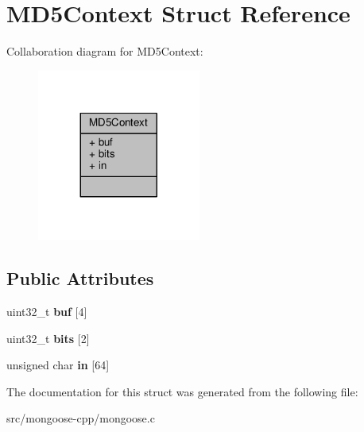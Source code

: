 \hypertarget{structMD5Context}{}\section{M\+D5\+Context Struct Reference}
\label{structMD5Context}


Collaboration diagram for M\+D5\+Context\+:
\nopagebreak
\begin{figure}[H]
\begin{center}
\leavevmode
\includegraphics[width=152pt]{d9/d12/structMD5Context__coll__graph}
\end{center}
\end{figure}
\subsection*{Public Attributes}
\begin{DoxyCompactItemize}
\item 
uint32\+\_\+t {\bfseries buf} \mbox{[}4\mbox{]}\hypertarget{structMD5Context_a6129b10b90387e1cb1d4cd92e4605c33}{}\label{structMD5Context_a6129b10b90387e1cb1d4cd92e4605c33}

\item 
uint32\+\_\+t {\bfseries bits} \mbox{[}2\mbox{]}\hypertarget{structMD5Context_a48f837fb64afd013f832e3cdab68e5de}{}\label{structMD5Context_a48f837fb64afd013f832e3cdab68e5de}

\item 
unsigned char {\bfseries in} \mbox{[}64\mbox{]}\hypertarget{structMD5Context_ae8be45f236e5cb12b0ae79da77e5f929}{}\label{structMD5Context_ae8be45f236e5cb12b0ae79da77e5f929}

\end{DoxyCompactItemize}


The documentation for this struct was generated from the following file\+:\begin{DoxyCompactItemize}
\item 
src/mongoose-\/cpp/mongoose.\+c\end{DoxyCompactItemize}
